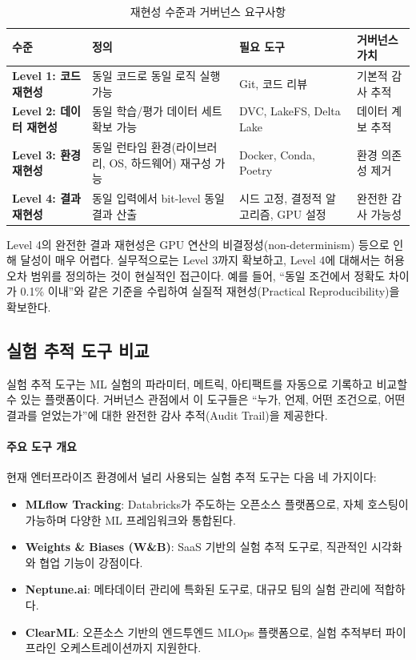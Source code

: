 \begin{table}[htbp]
\centering
\caption{재현성 수준과 거버넌스 요구사항}
\label{tab:14_reproducibility_levels}
\begin{tabularx}{\textwidth}{lXXX}
\toprule
\textbf{수준} & \textbf{정의} & \textbf{필요 도구} & \textbf{거버넌스 가치} \\
\midrule
\textbf{Level 1: 코드 재현성} & 동일 코드로 동일 로직 실행 가능 & Git, 코드 리뷰 & 기본적 감사 추적 \\
\textbf{Level 2: 데이터 재현성} & 동일 학습/평가 데이터 세트 확보 가능 & DVC, LakeFS, Delta Lake & 데이터 계보 추적 \\
\textbf{Level 3: 환경 재현성} & 동일 런타임 환경(라이브러리, OS, 하드웨어) 재구성 가능 & Docker, Conda, Poetry & 환경 의존성 제거 \\
\textbf{Level 4: 결과 재현성} & 동일 입력에서 bit-level 동일 결과 산출 & 시드 고정, 결정적 알고리즘, GPU 설정 & 완전한 감사 가능성 \\
\bottomrule
\end{tabularx}
\end{table}

Level 4의 완전한 결과 재현성은 GPU 연산의 비결정성(non-determinism) 등으로 인해 달성이 매우 어렵다. 실무적으로는 Level 3까지 확보하고, Level 4에 대해서는 허용 오차 범위를 정의하는 것이 현실적인 접근이다. 예를 들어, ``동일 조건에서 정확도 차이가 0.1\% 이내''와 같은 기준을 수립하여 실질적 재현성(Practical Reproducibility)을 확보한다.

\subsection{실험 추적 도구 비교}
\label{sec:14.2.2}

실험 추적 도구는 ML 실험의 파라미터, 메트릭, 아티팩트를 자동으로 기록하고 비교할 수 있는 플랫폼이다. 거버넌스 관점에서 이 도구들은 ``누가, 언제, 어떤 조건으로, 어떤 결과를 얻었는가''에 대한 완전한 감사 추적(Audit Trail)을 제공한다\cite{zaharia2018accelerating}.

\paragraph{주요 도구 개요}

현재 엔터프라이즈 환경에서 널리 사용되는 실험 추적 도구는 다음 네 가지이다:

\begin{itemize}
    \item \textbf{MLflow Tracking}: Databricks가 주도하는 오픈소스 플랫폼으로, 자체 호스팅이 가능하며 다양한 ML 프레임워크와 통합된다\cite{zaharia2018accelerating}.
    \item \textbf{Weights \& Biases (W\&B)}: SaaS 기반의 실험 추적 도구로, 직관적인 시각화와 협업 기능이 강점이다.
    \item \textbf{Neptune.ai}: 메타데이터 관리에 특화된 도구로, 대규모 팀의 실험 관리에 적합하다.
    \item \textbf{ClearML}: 오픈소스 기반의 엔드투엔드 MLOps 플랫폼으로, 실험 추적부터 파이프라인 오케스트레이션까지 지원한다.
\end{itemize}

